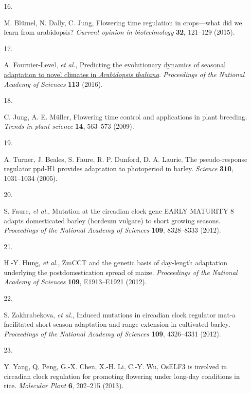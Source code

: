 \documentclass[
  9pt,
  twocolumn,
  twoside]{pnas-new}
\newlength{\cslhangindent}
\newlength{\csllabelwidth}
\newenvironment{CSLReferences}[2] %
 {\begin{list}{}{%
  \setlength{\itemindent}{0pt}
  \setlength{\leftmargin}{0pt}
  \setlength{\parsep}{0pt}
  \ifodd #1
   \setlength{\leftmargin}{\cslhangindent}
   \setlength{\itemindent}{-1\cslhangindent}
  \fi
  \setlength{\itemsep}{#2\baselineskip}}}
 {\end{list}}
\newcommand{\CSLLeftMargin}[1]{\parbox[t]{\csllabelwidth}{\strut#1\strut}}
\newcommand{\CSLRightInline}[1]{\parbox[t]{\linewidth - \csllabelwidth}{\strut#1\strut}}
\begin{document}
\begin{CSLReferences}{0}{1}
\CSLLeftMargin{16. }%
\CSLRightInline{M. Blümel, N. Dally, C. Jung, Flowering time regulation
in crops---what did we learn from arabidopsis? \emph{Current opinion in
biotechnology} \textbf{32}, 121--129 (2015).}

\CSLLeftMargin{17. }%
\CSLRightInline{A. Fournier-Level, \emph{et al.},
\href{https://doi.org/10.1073/pnas.1517456113}{Predicting the
evolutionary dynamics of seasonal adaptation to novel climates in
{\emph{Arabidopsis thaliana}}}. \emph{Proceedings of the National
Academy of Sciences} \textbf{113} (2016).}

\CSLLeftMargin{18. }%
\CSLRightInline{C. Jung, A. E. Müller, Flowering time control and
applications in plant breeding. \emph{Trends in plant science}
\textbf{14}, 563--573 (2009).}

\CSLLeftMargin{19. }%
\CSLRightInline{A. Turner, J. Beales, S. Faure, R. P. Dunford, D. A.
Laurie, The pseudo-response regulator ppd-H1 provides adaptation to
photoperiod in barley. \emph{Science} \textbf{310}, 1031--1034 (2005).}

\CSLLeftMargin{20. }%
\CSLRightInline{S. Faure, \emph{et al.}, Mutation at the circadian clock
gene EARLY MATURITY 8 adapts domesticated barley (hordeum vulgare) to
short growing seasons. \emph{Proceedings of the National Academy of
Sciences} \textbf{109}, 8328--8333 (2012).}

\CSLLeftMargin{21. }%
\CSLRightInline{H.-Y. Hung, \emph{et al.}, ZmCCT and the genetic basis
of day-length adaptation underlying the postdomestication spread of
maize. \emph{Proceedings of the National Academy of Sciences}
\textbf{109}, E1913--E1921 (2012).}

\CSLLeftMargin{22. }%
\CSLRightInline{S. Zakhrabekova, \emph{et al.}, Induced mutations in
circadian clock regulator mat-a facilitated short-season adaptation and
range extension in cultivated barley. \emph{Proceedings of the National
Academy of Sciences} \textbf{109}, 4326--4331 (2012).}

\CSLLeftMargin{23. }%
\CSLRightInline{Y. Yang, Q. Peng, G.-X. Chen, X.-H. Li, C.-Y. Wu, OsELF3
is involved in circadian clock regulation for promoting flowering under
long-day conditions in rice. \emph{Molecular Plant} \textbf{6}, 202--215
(2013).}


\end{CSLReferences}
\end{document}
